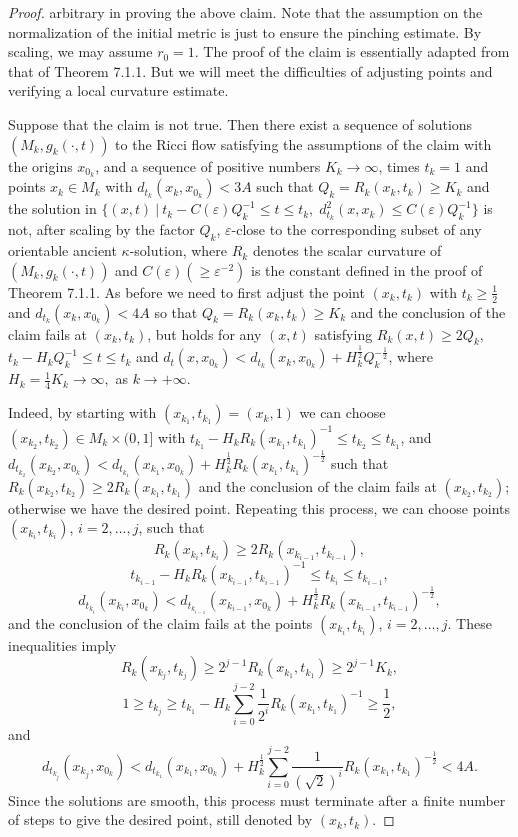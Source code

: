 \begin{proof}
arbitrary in proving the above claim. Note that the assumption on
the normalization of the initial metric is just to ensure the
pinching estimate. By scaling, we may assume $r_0=1$. The proof of
the claim is essentially adapted from that of Theorem 7.1.1. But
we will meet the difficulties of adjusting points and verifying a
local curvature estimate.

Suppose that the claim is not true. Then there exist a sequence of
solutions $(M_k,g_k(\cdot,t))$ to the Ricci flow satisfying the
assumptions of the claim with the origins $x_{0_k}$, and a
sequence of positive numbers $K_k\rightarrow\infty$, times $t_k=1$
and points $x_k\in M_k$ with $d_{t_k}(x_k,x_{0_k})<3A$ such that
$Q_k=R_k(x_k,t_k)\ge K_k$ and the solution in $\{(x,t)\ |\
t_k-C(\varepsilon)Q_k^{-1}\le t\le t_k,\;d_{t_k}^2(x,x_k)\le
C(\varepsilon)Q_k^{-1}\}$ is not, after scaling by the factor
$Q_k$, $\varepsilon$-close to the corresponding subset of any
orientable ancient $\kappa$-solution, where $R_k$ denotes the
scalar curvature of $(M_k,g_k(\cdot,t))$ and $C(\varepsilon)(\geq
\varepsilon^{-2})$ is the constant defined in the proof of Theorem
7.1.1. As before we need to first adjust the point $(x_k,t_k)$
with $t_k\ge\frac{1}{2}$ and $d_{t_k}(x_k,x_{0_k})<4A$ so that
$Q_k=R_k(x_k,t_k)\ge K_k$ and the conclusion of the claim fails at
$(x_k,t_k)$, but holds for any $(x,t)$ satisfying $R_k(x,t)\ge
2Q_k,$ $t_k-H_kQ_k^{-1}\le t\le t_k$ and
$d_t(x,x_{0_k})<d_{t_k}(x_k,x_{0_k})
+H_k^{\frac{1}{2}}Q_k^{-\frac{1}{2}}$, where
$H_k=\frac{1}{4}K_k\rightarrow\infty,$ as $k\rightarrow+\infty$.

Indeed, by starting with $(x_{k_1},t_{k_1})=(x_k,1)$ we can choose
$(x_{k_2},t_{k_2})\in M_k\times (0,1]$ with
$t_{k_1}-H_kR_k(x_{k_1},t_{k_1})^{-1}\le t_{k_2}\le t_{k_1}$, and
$d_{t_{k_2}}(x_{k_2},x_{0_k})<d_{t_{k_1}}(x_{k_1},x_{0_k})
+H_k^\frac{1}{2}R_k(x_{k_1},t_{k_1})^{-\frac{1}{2}}$ such that
$R_k(x_{k_2},t_{k_2})\ge 2R_k(x_{k_1},t_{k_1})$ and the conclusion
of the claim fails at $(x_{k_2},t_{k_2})$; otherwise we have the
desired point. Repeating this process, we can choose points
$(x_{k_i},t_{k_i})$, $i=2, \ldots, j$, such that
$$
R_k(x_{k_i},t_{k_i})\ge 2R_k(x_{k_{i-1}},t_{k_{i-1}}),
$$
$$
t_{k_{i-1}}-H_kR_k(x_{k_{i-1}},t_{k_{i-1}})^{-1} \le t_{k_{i}}\le
t_{k_{i-1}},
$$
$$
d_{t_{k_{i}}}(x_{k_{i}},x_{0_{k}})
<d_{t_{k_{i-1}}}(x_{k_{i-1}},x_{0_k})+H_k^\frac{1}{2}
R_k(x_{k_{i-1}},t_{k_{i-1}})^{-\frac{1}{2}},
$$
and the conclusion of the claim fails at the points
$(x_{k_i},t_{k_i})$, $i=2, \ldots, j$. These inequalities imply
$$
R_k(x_{k_{j}},t_{k_{j}})\ge 2^{j-1}R_k(x_{k_1},t_{k_1})\ge
2^{j-1}K_k,
$$
$$
1\ge t_{k_{j}}\ge t_{k_{1}}
-H_k\sum_{i=0}^{j-2}\frac{1}{2^i}R_k(x_{k_1},t_{k_1})^{-1}
\ge\frac{1}{2},
$$
and
$$
d_{t_{k_{j}}}(x_{k_j},x_{0_k}) <d_{t_{k_1}}(x_{k_1},x_{0_k})
+H_k^\frac{1}{2}\sum_{i=0}^{j-2}\frac{1}{(\sqrt{2})^i}
R_k(x_{k_1},t_{k_1})^{-\frac{1}{2}}<4A.
$$
Since the solutions are smooth, this process must terminate after
a finite number of steps to give the desired point, still denoted
by $(x_k,t_k).$


\end{proof}
